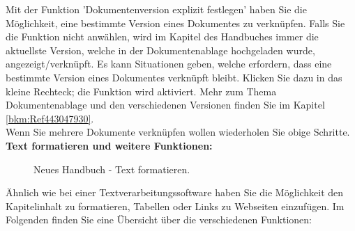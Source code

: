 Mit der Funktion 'Dokumentenversion explizit festlegen'  haben Sie die Möglichkeit, eine bestimmte Version eines Dokumentes zu verknüpfen. Falls Sie die Funktion nicht anwählen, wird im Kapitel des Handbuches immer die aktuellste Version, welche in der Dokumentenablage hochgeladen wurde, angezeigt/verknüpft. Es kann Situationen geben, welche erfordern, dass eine bestimmte Version eines Dokumentes verknüpft bleibt. Klicken Sie dazu in das kleine Rechteck; die Funktion wird aktiviert. Mehr zum Thema Dokumentenablage und den verschiedenen Versionen finden Sie im Kapitel \ref{bkm:Ref443047930}. \\

Wenn Sie mehrere Dokumente verknüpfen wollen wiederholen Sie obige Schritte. \\

\textbf{Text formatieren und weitere Funktionen:}

\begin{figure}[H]
\caption{Neues Handbuch - Text formatieren.}
\end{figure}

Ähnlich wie bei einer Textverarbeitungssoftware haben Sie die Möglichkeit den Kapitelinhalt zu formatieren, Tabellen oder Links zu Webseiten einzufügen. Im Folgenden finden Sie eine Übersicht über die verschiedenen Funktionen: \\

